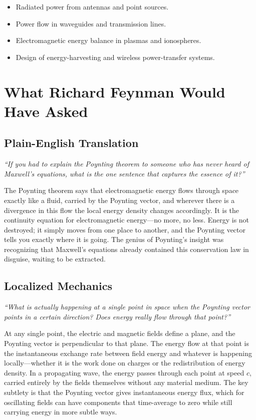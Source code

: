\documentclass[11pt,openright]{book}
\begin{document}
\begin{itemize}
    \item Radiated power from antennas and point sources.
    \item Power flow in waveguides and transmission lines.
    \item Electromagnetic energy balance in plasmas and ionospheres.
    \item Design of energy-harvesting and wireless power-transfer systems.
\end{itemize}
\section*{What Richard Feynman Would Have Asked}

\subsection*{Plain-English Translation}
\textit{``If you had to explain the Poynting theorem to someone who has never heard of Maxwell's equations, what is the one sentence that captures the essence of it?''}

The Poynting theorem says that electromagnetic energy flows through space exactly like a fluid, carried by the Poynting vector, and wherever there is a divergence in this flow the local energy density changes accordingly. It is the continuity equation for electromagnetic energy---no more, no less. Energy is not destroyed; it simply moves from one place to another, and the Poynting vector tells you exactly where it is going. The genius of Poynting's insight was recognizing that Maxwell's equations already contained this conservation law in disguise, waiting to be extracted.

\subsection*{Localized Mechanics}
\textit{``What is actually happening at a single point in space when the Poynting vector points in a certain direction? Does energy really flow through that point?''}

At any single point, the electric and magnetic fields define a plane, and the Poynting vector is perpendicular to that plane. The energy flow at that point is the instantaneous exchange rate between field energy and whatever is happening locally---whether it is the work done on charges or the redistribution of energy density. In a propagating wave, the energy passes through each point at speed $c$, carried entirely by the fields themselves without any material medium. The key subtlety is that the Poynting vector gives instantaneous energy flux, which for oscillating fields can have components that time-average to zero while still carrying energy in more subtle ways.
\end{document}
